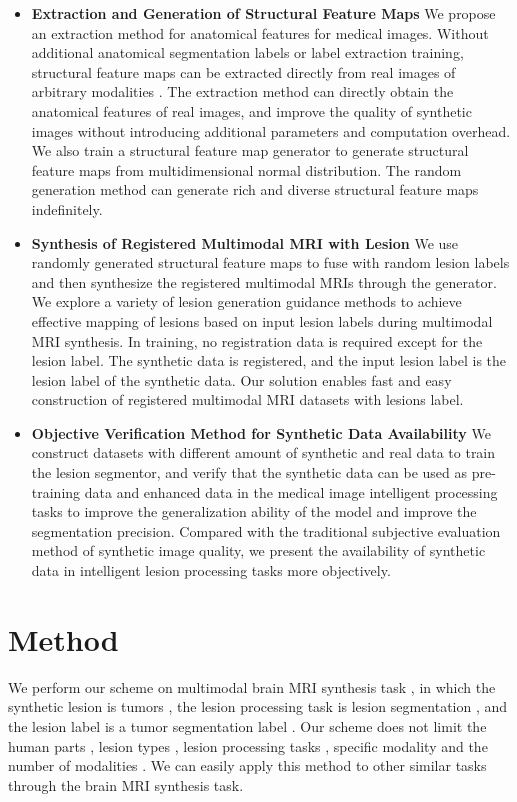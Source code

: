 \documentclass[letterpaper]{article} %
\begin{document}
\begin{itemize}
	\item \textbf{Extraction and Generation of Structural Feature Maps}
	We propose an extraction method for anatomical features for medical images. Without additional anatomical segmentation labels or label extraction training, structural feature maps can be extracted directly from real images of arbitrary modalities . The extraction method can directly obtain the anatomical features of real images, and improve the quality of synthetic images without introducing additional parameters and computation overhead. We also train a structural feature map generator to generate structural feature maps from multidimensional normal distribution. The random generation method can generate rich and diverse structural feature maps indefinitely.
	\item \textbf{Synthesis of Registered Multimodal MRI with Lesion}
	We use randomly generated structural feature maps to fuse with random lesion labels and then synthesize the registered multimodal MRIs through the generator. We explore a variety of lesion generation guidance methods to achieve effective mapping of lesions based on input lesion labels during multimodal MRI synthesis. In training, no registration data is required except for the lesion label. The synthetic data is registered, and the input lesion label is the lesion label of the synthetic data. Our solution enables fast and easy construction of registered multimodal MRI datasets with lesions label.
	\item \textbf{Objective Verification Method for Synthetic Data Availability}
	We construct datasets with different amount of synthetic and real data to train the lesion segmentor, and verify that the synthetic data can be used as pre-training data and enhanced data in the medical image intelligent processing tasks to improve the generalization ability of the model and improve the segmentation precision. Compared with the traditional subjective evaluation method of synthetic image quality, we present the availability of synthetic data in intelligent lesion processing tasks more objectively.
\end{itemize}


\section{Method}
\label{method}
We perform our scheme on multimodal brain MRI synthesis task , in which the synthetic lesion is tumors , the lesion processing task is lesion segmentation , and the lesion label is a tumor segmentation label . Our scheme does not limit the human parts , lesion types , lesion processing tasks , specific modality and the number of modalities . We can easily apply this method to other similar tasks through the brain MRI synthesis task. 
\end{document}
